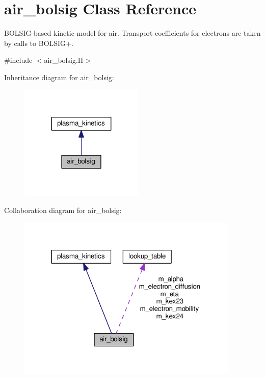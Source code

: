 \hypertarget{classair__bolsig}{}\section{air\+\_\+bolsig Class Reference}
\label{classair__bolsig}


B\+O\+L\+S\+I\+G-\/based kinetic model for air. Transport coefficients for electrons are taken by calls to B\+O\+L\+S\+I\+G+.  




{\ttfamily \#include $<$air\+\_\+bolsig.\+H$>$}



Inheritance diagram for air\+\_\+bolsig\+:\nopagebreak
\begin{figure}[H]
\begin{center}
\leavevmode
\includegraphics[width=167pt]{classair__bolsig__inherit__graph}
\end{center}
\end{figure}


Collaboration diagram for air\+\_\+bolsig\+:\nopagebreak
\begin{figure}[H]
\begin{center}
\leavevmode
\includegraphics[width=300pt]{classair__bolsig__coll__graph}
\end{center}
\end{figure}
